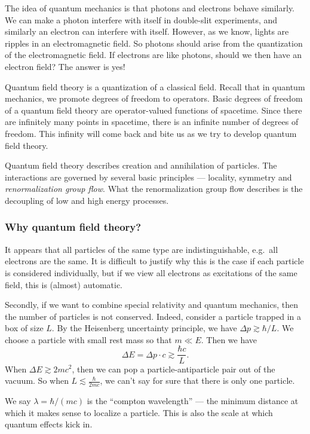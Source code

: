 \documentclass[a4paper]{article}
\begin{document}
The idea of quantum mechanics is that photons and electrons behave similarly. We can make a photon interfere with itself in double-slit experiments, and similarly an electron can interfere with itself. However, as we know, lights are ripples in an electromagnetic field. So photons should arise from the quantization of the electromagnetic field. If electrons are like photons, should we then have an electron field? The answer is yes!

Quantum field theory is a quantization of a classical field. Recall that in quantum mechanics, we promote degrees of freedom to operators. Basic degrees of freedom of a quantum field theory are operator-valued functions of spacetime. Since there are infinitely many points in spacetime, there is an infinite number of degrees of freedom. This infinity will come back and bite us as we try to develop quantum field theory.

Quantum field theory describes creation and annihilation of particles. The interactions are governed by several basic principles --- locality, symmetry and \emph{renormalization group flow}. What the renormalization group flow describes is the decoupling of low and high energy processes.

\subsubsection*{Why quantum field theory?}
It appears that all particles of the same type are indistinguishable, e.g.\ all electrons are the same. It is difficult to justify why this is the case if each particle is considered individually, but if we view all electrons as excitations of the same field, this is (almost) automatic.

Secondly, if we want to combine special relativity and quantum mechanics, then the number of particles is not conserved. Indeed, consider a particle trapped in a box of size $L$. By the Heisenberg uncertainty principle, we have $\Delta p \gtrsim \hbar/L$. We choose a particle with small rest mass so that $m \ll E$. Then we have
\[
  \Delta E = \Delta p \cdot c \gtrsim \frac{\hbar c}{L}.
\]
When $\Delta E \gtrsim 2 mc^2$, then we can pop a particle-antiparticle pair out of the vacuum. So when $L \lesssim \frac{\hbar}{2mc}$, we can't say for sure that there is only one particle.

We say $\lambda = \hbar/(mc)$ is the ``compton wavelength'' --- the minimum distance at which it makes sense to localize a particle. This is also the scale at which quantum effects kick in.
\end{document}
